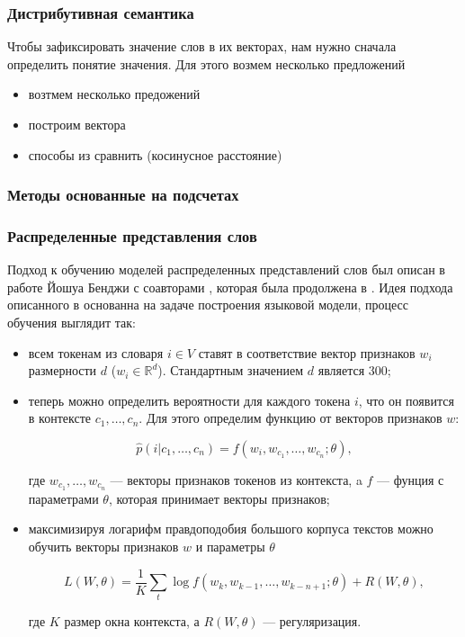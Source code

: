 \subsubsection{Дистрибутивная семантика}

Чтобы зафиксировать значение слов в их векторах, нам нужно сначала определить понятие значения. Для этого
возмем несколько предложений

\bigskip
\begin{itemize}
 \item возтмем несколько предожений
 \item построим вектора
 \item способы из сравнить (косинусное расстояние)
\end{itemize}



\subsubsection{Методы основанные на подсчетах}


\subsubsection{Распределенные представления слов}

Подход к обучению моделей распределенных представлений слов был описан в работе Йошуа Бенджи с соавторами
\cite{Bengio}, которая была продолжена в \cite{Zhou}. Идея подхода описанного в \cite{Bengio} основанна на
задаче построения языковой модели, процесс обучения выглядит так:

\bigskip
\begin{itemize}
 \item всем токенам из словаря $i \in V$ ставят в соответствие вектор признаков $w_i$ размерности $d$ ($w_i
\in \mathds{R}^d$). Стандартным значением $d$ является 300;

 \item теперь можно определить вероятности для каждого токена $i$, что он появится в контексте $c_1, \ldots,
c_n$. Для этого определим функцию от векторов признаков $w$:

 \begin{equation}
  \hat{p}(i|c_1, \ldots, c_n) = f(w_i, w_{c_1}, \ldots, w_{c_n}; \theta),
 \end{equation}

 где $w_{c_1}, \ldots, w_{c_n}$ --- векторы признаков токенов из контекста, a $f$ --- фунция с параметрами
$\theta$, которая принимает векторы признаков;

 \item максимизируя логарифм правдоподобия большого корпуса текстов можно обучить векторы признаков $w$ и
параметры $\theta$

 \begin{equation}
  L(W, \theta) = \frac{1}{K}\sum_t \log{f(w_k, w_{k-1}, \ldots, w_{k-n+1}; \theta) + R(W, \theta)},
 \end{equation}

 где $K$ размер окна контекста, а $R(W, \theta)$ --- регуляризация.

\end{itemize}

